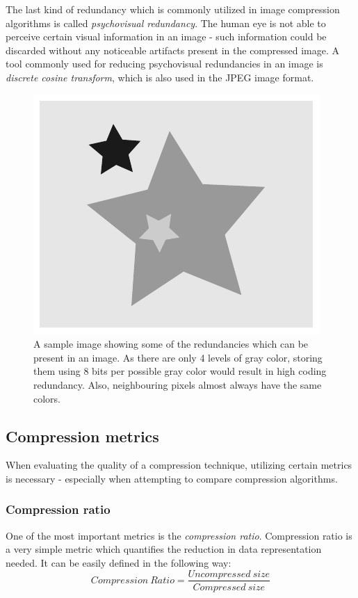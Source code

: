 \documentclass[thesis=M,english]{FITthesis}[2012/10/20]
\begin{document}
The last kind of redundancy which is commonly utilized in image compression
algorithms is called \emph{psychovisual redundancy}. The human eye is not
able to perceive certain visual information in an image - such information could
be discarded without any noticeable artifacts present in the compressed image.
A tool commonly used for reducing psychovisual redundancies in an image is
\emph{discrete cosine transform}, which is also used in the JPEG image
format.

\begin{figure}[h]
  \centering
  \includegraphics{imgs/redundancies}
  \caption{A sample image showing some of the redundancies which can be present in an image.
  		  As there are only 4 levels of gray color, storing them using 8 bits
  		  per possible gray color would result in high coding redundancy. Also,
  		  neighbouring pixels almost always have the same colors.}
  \label{fig:redundancies}
\end{figure}

\subsection{Compression metrics}
\label{metrics}
When evaluating the quality of a compression technique, utilizing certain
metrics is necessary - especially when attempting to compare compression
algorithms.

\subsubsection{Compression ratio}
One of the most important metrics is the \emph{compression ratio}.
Compression ratio is a very simple metric which quantifies the reduction
in data representation needed. It can be easily defined in the following
way:
\begin{equation}
Compression\ Ratio = \frac{Uncompressed\ size}{Compressed\ size}    
\end{equation}
\end{document}
